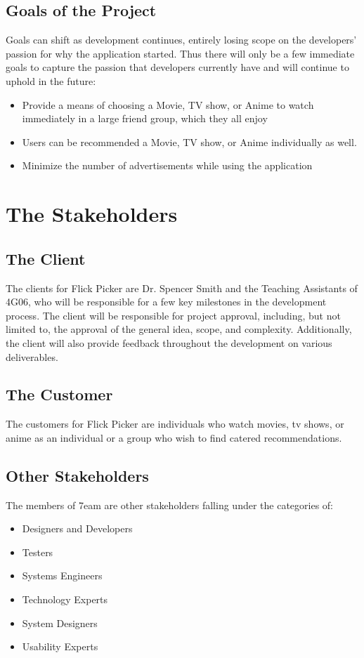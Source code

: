 \documentclass[12pt]{article}
\begin{document}
\subsection{Goals of the Project}
Goals can shift as development continues, entirely losing scope on the developers' passion for why the application started. Thus there will only be a few immediate goals to capture the passion that developers currently have and will continue to uphold in the future:
\begin{itemize}
	\item Provide a means of choosing a Movie, TV show, or Anime to watch immediately in a large friend group, which they all enjoy
	\item Users can be recommended a Movie, TV show, or Anime individually as well.
	\item Minimize the number of advertisements while using the application
\end{itemize}

\section{The Stakeholders}
\subsection{The Client}
The clients for Flick Picker are Dr. Spencer Smith and the Teaching Assistants of 4G06, who will be responsible for a few key milestones in the development process.
The client will be responsible for project approval, including, but not limited to, the approval of the general idea, scope, and complexity.
Additionally, the client will also provide feedback throughout the development on various deliverables.

\subsection{The Customer}
The customers for Flick Picker are individuals who watch movies, tv shows, or anime as an individual or a group who wish to find catered recommendations.

\subsection{Other Stakeholders}

The members of 7eam are other stakeholders falling under the categories of:
\begin{itemize}
    \item Designers and Developers
    \item Testers
    \item Systems Engineers
    \item Technology Experts
    \item System Designers
    \item Usability Experts
\end{itemize}
\end{document}
